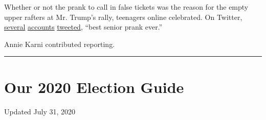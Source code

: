 Whether or not the prank to call in false tickets was the reason for the
empty upper rafters at Mr. Trump's rally, teenagers online celebrated.
On Twitter,
\href{https://twitter.com/sophiadelsol/status/1274145891490959360?s=20}{several}
\href{https://twitter.com/cbjeffreys/status/1274514747241750529?s=20}{accounts}
\href{https://twitter.com/s87788255/status/1274536326528856064?s=20}{tweeted},
``best senior prank ever.''

Annie Karni contributed reporting.

\begin{center}\rule{0.5\linewidth}{\linethickness}\end{center}

\hypertarget{our-2020-election-guide}{%
\section{Our 2020 Election Guide}\label{our-2020-election-guide}}

Updated July 31, 2020

